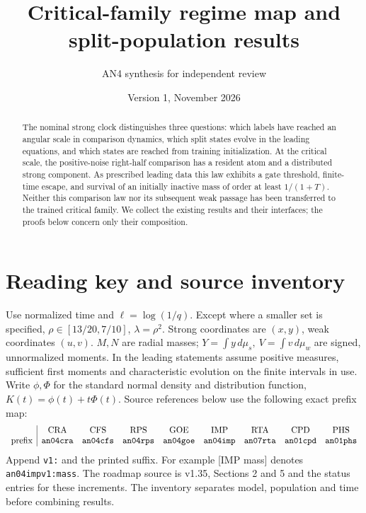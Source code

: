 \documentclass[11pt]{article}
\title{Critical-family regime map and split-population results}
\author{AN4 synthesis for independent review}\date{Version 1, November 2026}
\newcommand{\src}[1]{\textnormal{\small[#1]}}
\begin{document}
\maketitle
\begin{abstract}
The nominal strong clock distinguishes three questions: which labels have
reached an angular scale in comparison dynamics, which split states evolve
in the leading equations, and which states are reached from training
initialization. At the critical scale, the positive-noise right-half
comparison has a resident atom and a distributed strong component. As
prescribed leading data this law exhibits a gate threshold, finite-time
escape, and survival of an initially inactive mass of order at least
\(1/(1+T)\). Neither this comparison law nor its subsequent weak passage
has been transferred to the trained critical family. We collect the
existing results and their interfaces; the proofs below concern only
their composition.
\end{abstract}

\section{Reading key and source inventory}\label{an04rmsv1:inventory}
Use normalized time and \(\ell=\log(1/q)\). Except where a smaller
set is specified, \(\rho\in[13/20,7/10]\), \(\lambda=\rho^2\).
Strong coordinates are \((x,y)\), weak coordinates \((u,v)\).
\(M,N\) are radial masses; \(Y=\int y\,d\mu_s,\ V=\int v\,d\mu_w\)
are signed, unnormalized moments. In the leading statements assume
positive measures, sufficient first moments and characteristic evolution
on the finite intervals in use. Write \(\phi,\Phi\) for the standard
normal density and distribution function, \(K(t)=\phi(t)+t\Phi(t)\).
Source references below use the following exact prefix map:
\[
\begin{array}{c|cccccccc}
 &{\rm CRA}&{\rm CFS}&{\rm RPS}&{\rm GOE}&{\rm IMP}&{\rm RTA}&{\rm CPD}&{\rm PHS}\\
\text{prefix}&\texttt{an04cra}&\texttt{an04cfs}&\texttt{an04rps}&\texttt{an04goe}&
\texttt{an04imp}&\texttt{an07rta}&\texttt{an01cpd}&\texttt{an01phs}
\end{array}
\]
Append \texttt{v1:} and the printed suffix. For example
\src{IMP mass} denotes \texttt{an04impv1:mass}. The roadmap source is
v1.35, Sections 2 and 5 and the status entries for these increments.
The inventory separates model, population and time before combining results.
\end{document}
